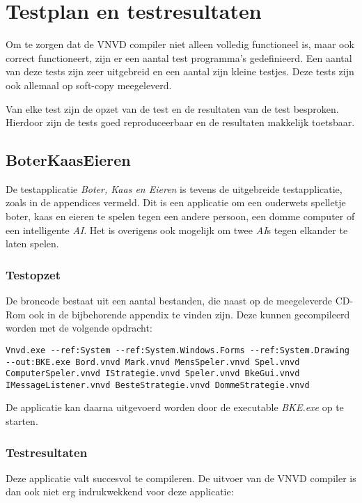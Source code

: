 \section{Testplan en testresultaten}
Om te zorgen dat de VNVD compiler niet alleen volledig functioneel is, maar ook correct functioneert, zijn er een aantal test programma's gedefinieerd. Een aantal van deze tests zijn zeer uitgebreid en een aantal zijn kleine testjes. Deze tests zijn ook allemaal op soft-copy meegeleverd.

Van elke test zijn de opzet van de test en de resultaten van de test besproken. Hierdoor zijn de tests goed reproduceerbaar en de resultaten makkelijk toetsbaar.

\subsection{BoterKaasEieren}
De testapplicatie \textit{Boter, Kaas en Eieren} is tevens de uitgebreide testapplicatie, zoals in de appendices vermeld. Dit is een applicatie om een ouderwets spelletje boter, kaas en eieren te spelen tegen een andere persoon, een domme computer of een intelligente \textit{AI}. Het is overigens ook mogelijk om twee \textit{AI}s tegen elkander te laten spelen.

\subsubsection{Testopzet}
De broncode bestaat uit een aantal bestanden, die naast op de meegeleverde CD-Rom ook in de bijbehorende appendix te vinden zijn. Deze kunnen gecompileerd worden met de volgende opdracht:

\begin{lstlisting}
Vnvd.exe --ref:System --ref:System.Windows.Forms --ref:System.Drawing --out:BKE.exe Bord.vnvd Mark.vnvd MensSpeler.vnvd Spel.vnvd ComputerSpeler.vnvd IStrategie.vnvd Speler.vnvd BkeGui.vnvd IMessageListener.vnvd BesteStrategie.vnvd DommeStrategie.vnvd
\end{lstlisting}

De applicatie kan daarna uitgevoerd worden door de executable \textit{BKE.exe} op te starten.

\subsubsection{Testresultaten}
Deze applicatie valt succesvol te compileren. De uitvoer van de VNVD compiler is dan ook niet erg indrukwekkend voor deze applicatie:

